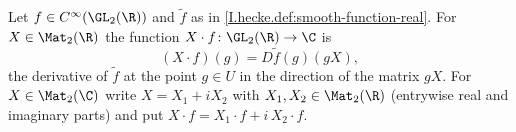 Let $f\in C^\infty(\GL_2(\R))$ and $\tilde f$ as in \cref{I.hecke.def:smooth-function-real}. For
$X\in\Mat_2(\R)$ the function $X\cdot f\colon\GL_2(\R)\to\C$ is
\[
  (X\cdot f)(g)=D\tilde f(g)(gX),
\]
the derivative of $\tilde f$ at the point $g\in U$ in the direction of the matrix $gX$. For $X\in\Mat_2(\C)$ write
$X=X_1+iX_2$ with $X_1,X_2\in\Mat_2(\R)$ (entrywise real and imaginary parts) and put
$X\cdot f=X_1\cdot f+i\,X_2\cdot f$.
